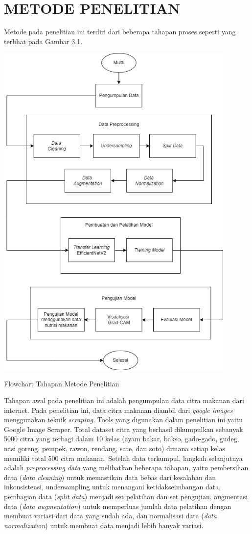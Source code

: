 \chapter{METODE PENELITIAN}

Metode pada penelitian ini terdiri dari beberapa tahapan proses seperti yang terlihat pada Gambar 3.1.
\begin{afigure}
    \includegraphics[height=0.74\textheight, width=0.9\textwidth, center]{images/flowchart.png}
    \caption{Flowchart Tahapan Metode Penelitian}
    \label{fig:flowchart-metode}
\end{afigure}

Tahapan awal pada penelitian ini adalah pengumpulan data citra makanan dari internet. Pada penelitian ini, data citra makanan diambil dari \textit{google images} menggunakan teknik \textit{scraping}. Tools yang digunakan dalam penelitian ini yaitu Google Image Scraper. Total dataset citra yang berhasil dikumpulkan sebanyak 5000 citra yang terbagi dalam 10 kelas (ayam bakar, bakso, gado-gado, gudeg, nasi goreng, pempek, rawon, rendang, sate, dan soto) dimana setiap kelas memiliki total 500 citra makanan. Setelah data terkumpul, langkah selanjutnya adalah \textit{preprocessing data} yang melibatkan beberapa tahapan, yaitu pembersihan data (\textit{data cleaning}) untuk memastikan data bebas dari kesalahan dan inkonsistensi, undersampling untuk menangani ketidakseimbangan data, pembagian data (\textit{split data}) menjadi set pelatihan dan set pengujian, augmentasi data (\textit{data augmentation}) untuk memperluas jumlah data pelatihan dengan membuat variasi dari data yang sudah ada, dan normalisasi data (\textit{data normalization}) untuk membuat data menjadi lebih banyak variasi.

